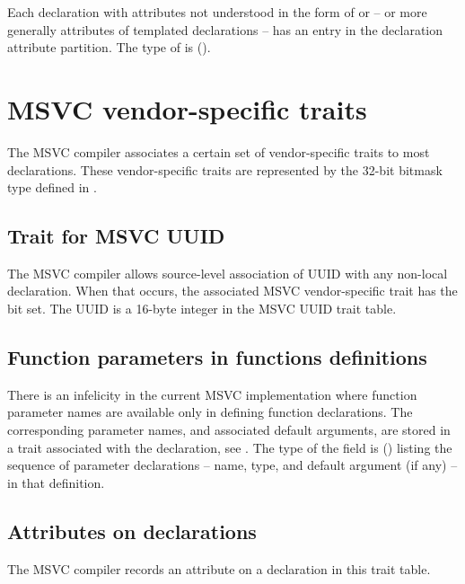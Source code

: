 Each declaration  with attributes not understood in the form of 
 or  -- or more generally attributes of templated declarations --
has an entry in the declaration attribute partition.  The type  of  is 
 ().



\section{MSVC vendor-specific traits}
\label{sec:ifc-msvc-vendor-specific-trait}

The MSVC compiler associates a certain set of vendor-specific traits to most declarations.  
These vendor-specific traits are represented by the 32-bit bitmask type 
defined in .



\subsection{Trait for MSVC UUID}
\label{sec:ifc-msvc-uuid-trait}

The MSVC compiler allows source-level association of UUID with any non-local declaration. When that occurs,
the associated MSVC vendor-specific trait has the  bit set.  The  UUID is a
16-byte integer in the MSVC UUID trait table.


\subsection{Function parameters in functions definitions}
\label{sec:ifc-msvc-fun-parms}

There is an infelicity in the current MSVC implementation where function parameter names are available only in defining function declarations.
The corresponding parameter names, and associated default arguments, are stored in a trait associated with the declaration, see .
The type of the  field
is  () listing the sequence of parameter declarations -- name, type, and default argument (if any) -- in that definition.



\subsection{Attributes on declarations}
\label{sec:ifc-msvc-decl-attr-trait}

The MSVC compiler records an attribute on a declaration in this trait table.





